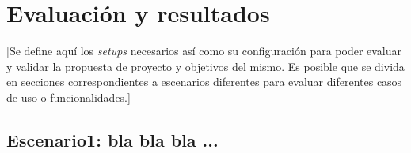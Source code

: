 \chapter{Evaluación y resultados}\label{cap:evaluación}

[Se define aquí los \textit{setups} necesarios así como su configuración para poder evaluar y validar la propuesta de proyecto y objetivos del mismo. Es posible que se divida en secciones correspondientes a escenarios diferentes para evaluar diferentes casos de uso o funcionalidades.]

\section{Escenario1: bla bla bla ...}



